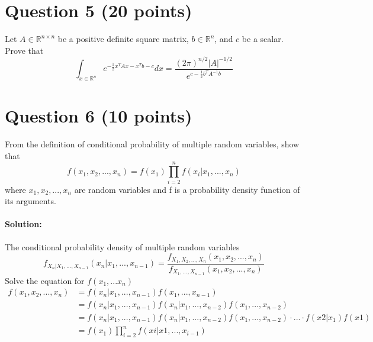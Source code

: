 \documentclass[
	10pt, %
]{../fphw}
\begin{document}
	\section*{Question 5 (20 points)}
	\begin{problem}
		Let $A\in\mathbb{R}^{n\times n}$ be a positive definite square matrix, $b\in\mathbb{R}^n$, and $c$ be a scalar. Prove that
		\begin{equation*}
			\int_{x\in\mathbb{R}^n} e^{-\frac{1}{2}x^TAx-x^Tb-c} dx 
			= \frac{(2\pi)^{n/2}|A|^{-1/2}}{e^{c-\frac{1}{2}b^TA^{-1}b}}
		\end{equation*}
	\end{problem}

	\section*{Question 6 (10 points)}
	\begin{problem}
		From the definition of conditional probability of multiple random variables, show that
		\begin{equation*}
			f(x_1,x_2,...,x_n) = f(x_1)\prod_{i=2}^{n}f(x_i|x_1,...,x_n)
		\end{equation*}
		where $x_1,x_2,...,x_n$ are random variables and f is a probability density function of its arguments.
	\end{problem}
	\paragraph{Solution:} The conditional probability density of multiple random variables
	\begin{equation*}
		f_{X_n|X_1,...,X_{n-1}}(x_n|x_1,...,x_{n-1}) = \frac{f_{X_1,X_2,...,X_n}(x_1,x_2,...,x_n)}{f_{X_1,...,X_{n-1}}(x_1,x_2,...,x_n)}
	\end{equation*}
	Solve the equation for $f(x_1,...x_n)$
	\begin{align*}
		f(x_1,x_2,...,x_n) &= f(x_n|x_1,...,x_{n-1})f(x_1,...,x_{n-1})\\
		&= f(x_n|x_1,...,x_{n-1})f(x_n|x_1,...,x_{n-2})f(x_1,...,x_{n-2})\\
		&= f(x_n|x_1,...,x_{n-1})f(x_n|x_1,...,x_{n-2})f(x_1,...,x_{n-2})\cdot ...\cdot f(x2|x_1)f(x1)\\
		&= f(x_1)\prod_{i=2}^{n}f(xi|x1,...,x_{i-1})
	\end{align*}
	
\end{document}
